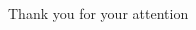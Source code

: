 \STANDARD{}
{
  \begin{columns}
    \begin{column}{0.35\textwidth}
      \begin{block}{~~~~~~~~Thank you}
        \centering
        for your attention
      \end{block}
    \end{column}
  \end{columns}
}


